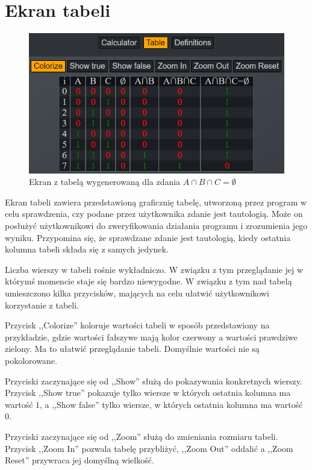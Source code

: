 \documentclass{SGGW-thesis}
\begin{document}
\section{Ekran tabeli}
\begin{figure}[h]
    \hspace{1.5cm}
    \includegraphics{screenshots/table.png}
    \caption{Ekran z tabelą wygenerowaną dla zdania $A \cap B \cap C = \emptyset$}
    \label{fig:table}
\end{figure}

\begin{paragraph}{}
    Ekran tabeli zawiera przedstawioną graficznię tabelę, utworzoną przez program w celu sprawdzenia, czy podane przez użytkownika zdanie jest tautologią. Może on posłużyć użytkownikowi do zweryfikowania działania programu i zrozumienia jego wyniku. Przypomina się, że sprawdzane zdanie jest tautologią, kiedy ostatnia kolumna tabeli składa się z samych jedynek.

    Liczba wierszy w tabeli rośnie wykładniczo. W związku z tym przeglądanie jej w którymś momencie staje się bardzo niewygodne. W związku z tym nad tabelą umieszczono kilka przycisków, mających na celu ułatwić użytkownikowi korzystanie z tabeli.

    Przycisk ,,Colorize'' koloruje wartości tabeli w sposób przedstawiony na przykładzie, gdzie wartości fałszywe mają kolor czerwony a wartości prawdziwe zielony. Ma to ułatwić przeglądanie tabeli. Domyślnie wartości nie są pokolorowane.

    Przyciski zaczynające się od ,,Show'' służą do pokazywania konkretnych wierszy. Przycisk ,,Show true'' pokazuje tylko wiersze w których ostatnia kolumna ma wartość $1$, a ,,Show false'' tylko wiersze, w których ostatnia kolumna ma wartość $0$.

    Przyciski zaczynające się od ,,Zoom'' służą do zmieniania rozmiaru tabeli. Przycisk ,,Zoom In'' pozwala tabelę przybliżyć, ,,Zoom Out'' oddalić a ,,Zoom Reset'' przywraca jej domyślną wielkość.
\end{paragraph}
\end{document}
